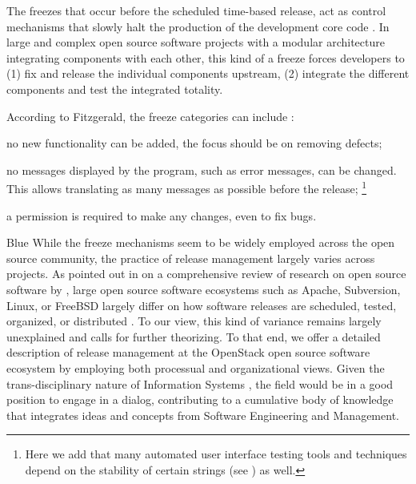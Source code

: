 \documentclass[dvipsnames]{interact}
\theoremstyle{plain}\newtheorem{theorem}{Theorem}[section]
\theoremstyle{definition}
\theoremstyle{remark}
\begin{document}
The freezes that occur before the scheduled time-based release, act as control mechanisms that slowly halt the production of the development core code \citep{Fitzgerald2011,AnandBhatt_et_al2017}. In large and complex open source software projects with a modular architecture integrating components with each other, this kind of a freeze forces developers to (1) fix and release the individual components upstream, (2) integrate the different components and test the integrated totality.  

According to Fitzgerald, the freeze categories can include \citep{Fitzgerald2011}: 
\begin{description}[leftmargin=!,labelwidth=\widthof{\bfseries feature freeze}]
\footnotesize
 \item[feature freeze] no new functionality can be added, the focus should be on removing defects;
\item[string freeze] no messages displayed by the program, such as error messages,  can be changed. This allows translating as many messages as possible before the release; \footnote{Here we add that many automated user interface testing tools and techniques depend on the stability of certain strings (see \citep{MesbahVanDeursen2009,ArtziDolby_et_al2011}) as well.}
\item[code freeze] a permission  is required to make any changes, even to fix bugs.
\end{description}


\begin{color}{Blue}
While the freeze mechanisms seem to be widely employed across the open source community, the practice of release management largely varies across projects. As pointed out in on a comprehensive review of research on open source software by \citet{Crowston_and_Howison2008}, large open source software ecosystems such as Apache, Subversion, Linux, or FreeBSD largely differ  on how software releases are scheduled, tested, organized, or distributed \citep{Glance2004,Crowston_and_Howison2008,Erenkrantz2003,MichlmayrFitzgerald_et_al2015,Teixeira2017}. To our view, this kind of variance remains largely unexplained and  calls for further theorizing.  To that end, we offer a detailed description of release management at the OpenStack open source software ecosystem by employing both processual and organizational views.  Given the trans-disciplinary nature of Information Systems \citep{Galliers2003,CarilloBernard2015}, the field would be in a good position to engage in a dialog, contributing to a cumulative body of knowledge that integrates ideas and concepts from Software Engineering and Management.  


\end{color}
\end{document}
